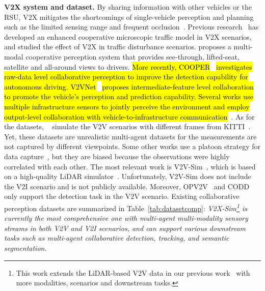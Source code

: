 \textbf{V2X system and dataset.} By sharing information with other vehicles or the RSU, V2X mitigates the shortcomings of single-vehicle perception and planning such as the limited sensing range and frequent occlusion~\cite{machardy2018v2x}. Previous research~\cite{Jia2016EnhancedCC} has developed an enhanced cooperative microscopic traffic model in V2X scenarios, and studied the effect of V2X in traffic disturbance scenarios. \cite{Kim2015MultivehicleCD} proposes a multi-modal cooperative perception system that provides see-through, lifted-seat, satellite and all-around views to drivers. \hl{More recently, COOPER}~\cite{Chen2019CooperCP} \hl{investigates raw-data level collaborative perception to improve the detection capability for autonomous driving. V2VNet}~\cite{Wang2020V2VNetVC}
\hl{proposes intermediate-feature level collaboration to promote the vehicle's perception and prediction capability. Several works use multiple infrastructure sensors to jointly perceive the environment and employ output-level collaboration with vehicle-to-infrastructure communication}~\cite{arnold2020cooperative, howe2021weakly}. As for the datasets, ~\cite{Chen2019CooperCP,Xiao2018MultimediaFA,Maalej2017VANETsMA} simulate the V2V scenarios with different frames from KITTI~\cite{Geiger2012AreWR}. Yet, these datasets are unrealistic multi-agent datasets for the measurements are not captured by different viewpoints. Some other works use a platoon strategy for data capture~\cite{Rawashdeh2018CollaborativeAD, Chen2015DSRCAR}, but they are biased because the observations were highly correlated with each other.
The most relevant work is V2V-Sim~\cite{Wang2020V2VNetVC}, which is based on a high-quality LiDAR simulator~\cite{Manivasagam2020LiDARsimRL}. Unfortunately, V2V-Sim does not include the V2I scenario and is not publicly available. Moreover, OPV2V~\cite{xu2021opv2v} and CODD~\cite{arnold2021fastreg} only support the detection task in the V2V scenario. Existing collaborative perception datasets are summarized in Table~\ref{tab:datasetcomp}: \textit{V2X-Sim\footnote{This work extends the LiDAR-based V2V data in our previous work~\cite{Li_2021_NeurIPS} with more modalities, scenarios and downstream tasks.} is currently the most comprehensive one with multi-agent multi-modality sensory streams in both V2V and V2I scenarios, and can support various downstream tasks such as multi-agent collaborative detection, tracking, and semantic segmentation.}

